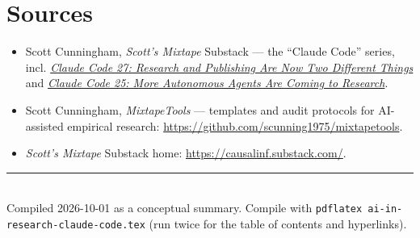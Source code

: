 \documentclass[11pt]{article}
\begin{document}
\section*{Sources}
\begin{itemize}
  \item Scott Cunningham, \emph{Scott's Mixtape} Substack --- the ``Claude
        Code'' series, incl. \href{https://causalinf.substack.com/p/claude-code-27-research-and-publishing}{\textit{Claude Code 27: Research and Publishing Are Now Two Different Things}} and \href{https://causalinf.substack.com/p/claude-code-25-more-autonomous-agents}{\textit{Claude Code 25: More Autonomous Agents Are Coming to Research}}.
  \item Scott Cunningham, \emph{MixtapeTools} --- templates and audit protocols
        for AI-assisted empirical research: \url{https://github.com/scunning1975/mixtapetools}.
  \item \emph{Scott's Mixtape} Substack home: \url{https://causalinf.substack.com/}.
\end{itemize}

\vspace{1em}
\noindent\rule{\linewidth}{0.4pt}\\
{\footnotesize Compiled 2026-10-01 as a conceptual summary. Compile with
\texttt{pdflatex ai-in-research-claude-code.tex} (run twice for the table of
contents and hyperlinks).}
\end{document}
